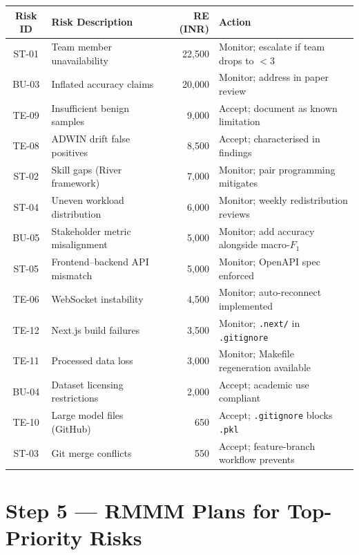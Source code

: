 \documentclass[11pt, a4paper]{article}
\newcommand{\col}[1]{\texttt{\small #1}}
\begin{document}
\small
\begin{longtable}{|c|p{4.5cm}|r|p{5cm}|}
\hline
\rowcolor{lightgray}
\textbf{Risk ID} & \textbf{Risk Description} & \textbf{RE (INR)} & \textbf{Action} \\
\hline
\endfirsthead

ST-01 & Team member unavailability & 22,500 & Monitor; escalate if team drops to $<$3 \\
\hline
BU-03 & Inflated accuracy claims & 20,000 & Monitor; address in paper review \\
\hline
TE-09 & Insufficient benign samples & 9,000 & Accept; document as known limitation \\
\hline
TE-08 & ADWIN drift false positives & 8,500 & Accept; characterised in findings \\
\hline
ST-02 & Skill gaps (River framework) & 7,000 & Monitor; pair programming mitigates \\
\hline
ST-04 & Uneven workload distribution & 6,000 & Monitor; weekly redistribution reviews \\
\hline
BU-05 & Stakeholder metric misalignment & 5,000 & Monitor; add accuracy alongside macro-$F_1$ \\
\hline
ST-05 & Frontend--backend API mismatch & 5,000 & Monitor; OpenAPI spec enforced \\
\hline
TE-06 & WebSocket instability & 4,500 & Monitor; auto-reconnect implemented \\
\hline
TE-12 & Next.js build failures & 3,500 & Monitor; \col{.next/} in \col{.gitignore} \\
\hline
TE-11 & Processed data loss & 3,000 & Monitor; Makefile regeneration available \\
\hline
BU-04 & Dataset licensing restrictions & 2,000 & Accept; academic use compliant \\
\hline
TE-10 & Large model files (GitHub) & 650 & Accept; \col{.gitignore} blocks \col{.pkl} \\
\hline
ST-03 & Git merge conflicts & 550 & Accept; feature-branch workflow prevents \\
\hline
\end{longtable}
\normalsize

\newpage

\section{Step 5 --- RMMM Plans for Top-Priority Risks}
\label{sec:rmmm}
\end{document}

